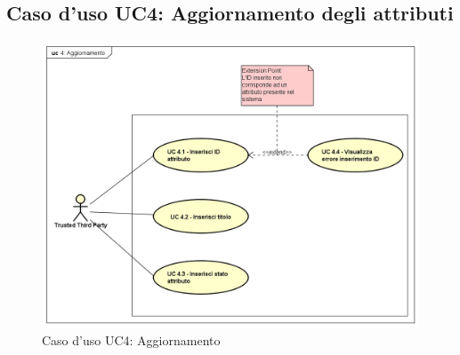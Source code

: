 \subsection{Caso d'uso UC4: Aggiornamento degli attributi}
\begin{figure}[h]
	\centering
	\includegraphics[scale=0.50]{immagini/usecase/UC4_Aggiornamento}
	\caption{Caso d'uso UC4: Aggiornamento}
\end{figure}
